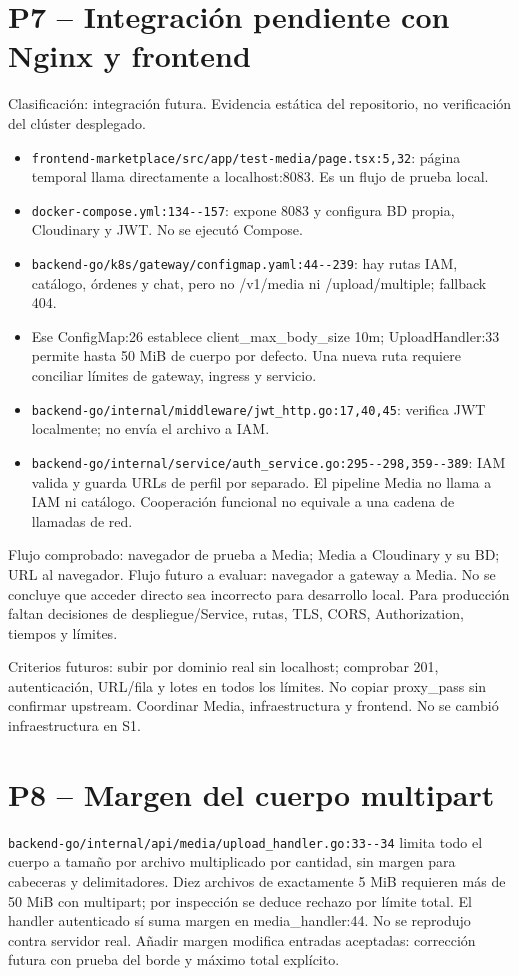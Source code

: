 \documentclass[11pt,a4paper]{article}
\begin{document}
\section{P7 -- Integración pendiente con Nginx y frontend}
Clasificación: integración futura. Evidencia estática del repositorio, no verificación del clúster desplegado.
\begin{itemize}
\item \nolinkurl{frontend-marketplace/src/app/test-media/page.tsx:5,32}: página temporal llama directamente a localhost:8083. Es un flujo de prueba local.
\item \nolinkurl{docker-compose.yml:134--157}: expone 8083 y configura BD propia, Cloudinary y JWT. No se ejecutó Compose.
\item \nolinkurl{backend-go/k8s/gateway/configmap.yaml:44--239}: hay rutas IAM, catálogo, órdenes y chat, pero no /v1/media ni /upload/multiple; fallback 404.
\item Ese ConfigMap:26 establece client\_max\_body\_size 10m; UploadHandler:33 permite hasta 50 MiB de cuerpo por defecto. Una nueva ruta requiere conciliar límites de gateway, ingress y servicio.
\item \nolinkurl{backend-go/internal/middleware/jwt_http.go:17,40,45}: verifica JWT localmente; no envía el archivo a IAM.
\item \nolinkurl{backend-go/internal/service/auth_service.go:295--298,359--389}: IAM valida y guarda URLs de perfil por separado. El pipeline Media no llama a IAM ni catálogo. Cooperación funcional no equivale a una cadena de llamadas de red.
\end{itemize}
Flujo comprobado: navegador de prueba a Media; Media a Cloudinary y su BD; URL al navegador. Flujo futuro a evaluar: navegador a gateway a Media. No se concluye que acceder directo sea incorrecto para desarrollo local. Para producción faltan decisiones de despliegue/Service, rutas, TLS, CORS, Authorization, tiempos y límites.

Criterios futuros: subir por dominio real sin localhost; comprobar 201, autenticación, URL/fila y lotes en todos los límites. No copiar proxy\_pass sin confirmar upstream. Coordinar Media, infraestructura y frontend. No se cambió infraestructura en S1.

\section{P8 -- Margen del cuerpo multipart}
\nolinkurl{backend-go/internal/api/media/upload_handler.go:33--34} limita todo el cuerpo a tamaño por archivo multiplicado por cantidad, sin margen para cabeceras y delimitadores. Diez archivos de exactamente 5 MiB requieren más de 50 MiB con multipart; por inspección se deduce rechazo por límite total. El handler autenticado sí suma margen en media\_handler:44. No se reprodujo contra servidor real. Añadir margen modifica entradas aceptadas: corrección futura con prueba del borde y máximo total explícito.
\end{document}
